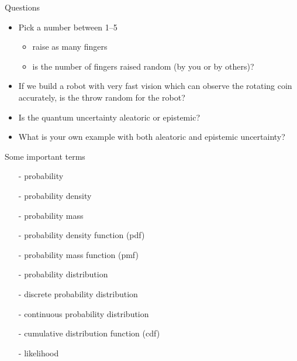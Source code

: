 \documentclass[english,t]{beamer}
\begin{document}
\begin{frame}{Questions}

  \begin{itemize}
  \item<1-> Pick a number between 1--5
    \begin{itemize}
    \item<2-> raise as many fingers 
    \item<3-> is the number of fingers raised random (by you or by others)?
    \end{itemize}
    \vspace{\baselineskip}
  \item<4-> If we build a robot with very fast vision which can observe
    the rotating coin accurately, is the throw random for the robot?
    \vspace{\baselineskip}
  \item<5-> Is the quantum uncertainty aleatoric or epistemic?
    \vspace{\baselineskip}
  \item<6-> What is your own example with both aleatoric and epistemic
    uncertainty?
  \end{itemize}
\end{frame}

\begin{frame}{Some important terms}
  
  \begin{itemize}
  \item[-] probability
  \item[-] probability density
  \item[-] probability mass
  \item[-] probability density function (pdf)
  \item[-] probability mass function (pmf)
  \item[-] probability distribution
  \item[-] discrete probability distribution
  \item[-] continuous probability distribution
  \item[-] cumulative distribution function (cdf)
  \item[-] likelihood
  \end{itemize}
  
\end{frame}
  
\end{document}
